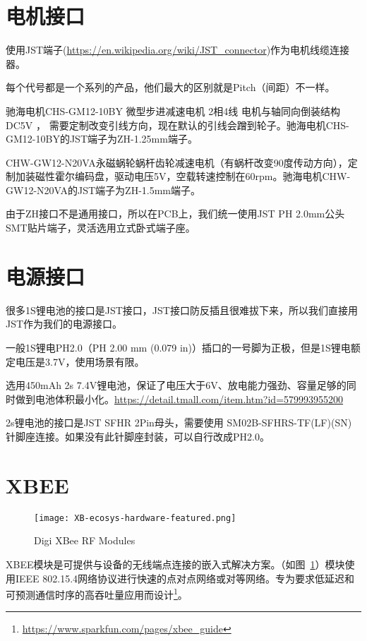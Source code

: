 \section{电机接口}

使用JST端子(\url{https://en.wikipedia.org/wiki/JST_connector})作为电机线缆连接器。

每个代号都是一个系列的产品，他们最大的区别就是Pitch（间距）不一样。

驰海电机CHS-GM12-10BY 微型步进减速电机 2相4线 电机与轴同向倒装结构 DC5V ， 需要定制改变引线方向，现在默认的引线会蹭到轮子。驰海电机CHS-GM12-10BY的JST端子为ZH-1.25mm端子。

CHW-GW12-N20VA永磁蜗轮蜗杆齿轮减速电机（有蜗杆改变90度传动方向），定制加装磁性霍尔编码盘，驱动电压5V，空载转速控制在60rpm。驰海电机CHW-GW12-N20VA的JST端子为ZH-1.5mm端子。

由于ZH接口不是通用接口，所以在PCB上，我们统一使用JST PH 2.0mm公头SMT贴片端子，灵活选用立式卧式端子座。

\section{电源接口}

很多1S锂电池的接口是JST接口，JST接口防反插且很难拔下来，所以我们直接用JST作为我们的电源接口。

一般1S锂电PH2.0（PH 2.00 mm (0.079 in)）插口的一号脚为正极，但是1S锂电额定电压是3.7V，使用场景有限。

选用450mAh 2s 7.4V锂电池，保证了电压大于6V、放电能力强劲、容量足够的同时做到电池体积最小化。\url{https://detail.tmall.com/item.htm?id=579993955200}

2s锂电池的接口是JST SFHR 2Pin母头，需要使用 SM02B-SFHRS-TF(LF)(SN) 针脚座连接。如果没有此针脚座封装，可以自行改成PH2.0。


\section{XBEE}

\begin{figure}[htbp]
    \centering
    \texttt{[image: XB-ecosys-hardware-featured.png]}
    \caption{Digi XBee RF Modules}
    \label{fig:XB}
\end{figure}

XBEE模块是可提供与设备的无线端点连接的嵌入式解决方案。（如图~\ref{fig:XB}）模块使用IEEE 802.15.4网络协议进行快速的点对点网络或对等网络。专为要求低延迟和可预测通信时序的高吞吐量应用而设计\footnote{\url{https://www.sparkfun.com/pages/xbee_guide}}。

